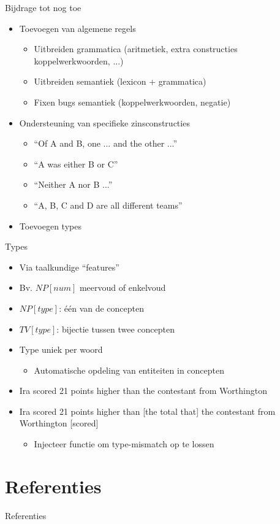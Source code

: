 \documentclass[notes, dvipsnames]{beamer}
\newcommand{\seperation}{
	\vspace{1em}
	\ppause
}
\newcommand{\hitem}{
	\ppause
	\item
}
\newcommand{\ppause}{\onslide<+>}
\begin{document}
	\begin{frame}{Bijdrage tot nog toe}
    \begin{itemize}
      \hitem Toevoegen van algemene regels
        \begin{itemize}
          \item Uitbreiden grammatica (aritmetiek, extra constructies koppelwerkwoorden, ...)
          \item Uitbreiden semantiek (lexicon + grammatica)
          \item Fixen bugs semantiek (koppelwerkwoorden, negatie)
        \end{itemize}
      \hitem Ondersteuning van specifieke zinsconstructies
        \begin{itemize}
          \item ``Of A and B, one ... and the other ...''
          \item ``A was either B or C''
          \item ``Neither A nor B ...''
          \item ``A, B, C and D are all different teams''
        \end{itemize}
      \hitem Toevoegen types
    \end{itemize}
	\end{frame}

	\begin{frame}{Types}
    \begin{itemize}
      \hitem Via taalkundige ``features''
      \item Bv. $NP[num]$ meervoud of enkelvoud
      \hitem $NP[type]$: één van de concepten
      \item $TV[type]$: bijectie tussen twee concepten
      \hitem Type uniek per woord
      \begin{itemize}
        \item Automatische opdeling van entiteiten in concepten
      \end{itemize}

      \seperation
      \item Ira scored 21 points higher than the contestant from Worthington
      \hitem Ira scored 21 points higher than [the total that] the contestant from Worthington [scored]
      \begin{itemize}
          \item Injecteer functie om type-mismatch op te lossen
      \end{itemize}
    \end{itemize}
	\end{frame}
			
	\section{Referenties}
	\begin{frame}[allowframebreaks]{Referenties}
		
		
	\end{frame}
	
\end{document}
